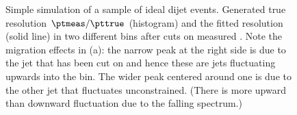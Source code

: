\documentclass[a4paper]{cmspaper} %
\begin{document}
\begin{figure}[ht]
  \begin{center}
     
  \end{center}
  \caption{Simple simulation of a sample of ideal dijet
    events. Generated true resolution \mbox{$\ptmeas / \pttrue$} (histogram) and the fitted
    resolution (solid line) in two different \pttrue bins after cuts on measured \pt.
    Note the migration effects in (a): the narrow peak at the right side is due to the jet that has been cut on and hence these are jets fluctuating upwards into the \pt bin.
    The wider peak centered around one is due to the other jet that fluctuates unconstrained.
    (There is more upward than downward fluctuation due to the falling spectrum.)
  }
  \label{fig:resFit:toyMC:ptCuts:reso}
\end{figure}
\end{document}

